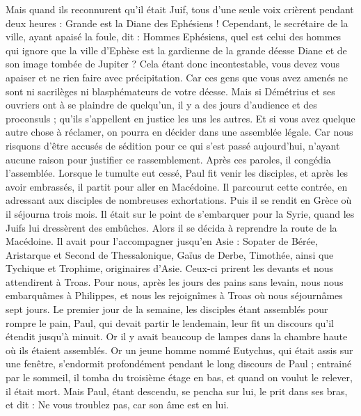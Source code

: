 \begin{multicols}{2}
Mais quand ils reconnurent qu'il était Juif, tous d’une seule voix crièrent pendant deux heures : Grande est la Diane des Ephésiens !
Cependant, le secrétaire de la ville, ayant apaisé la foule, dit : Hommes Ephésiens, quel est celui des hommes qui ignore que la ville d’Ephèse est la gardienne de la grande déesse Diane et de son image tombée de Jupiter ?
Cela étant donc incontestable, vous devez vous apaiser et ne rien faire avec précipitation.
Car ces gens que vous avez amenés ne sont ni sacrilèges ni blasphémateurs de votre déesse.
Mais si Démétrius et ses ouvriers ont à se plaindre de quelqu’un, il y a des jours d’audience et des proconsuls ; qu’ils s’appellent en justice les uns les autres.
Et si vous avez quelque autre chose à réclamer, on pourra en décider dans une assemblée légale.
Car nous risquons d’être accusés de sédition pour ce qui s'est passé aujourd'hui, n’ayant aucune raison pour justifier ce rassemblement. Après ces paroles, il congédia l’assemblée.
\VerseOne{}Lorsque le tumulte eut cessé, Paul fit venir les disciples, et après les avoir embrassés, il partit pour aller en Macédoine.
Il parcourut cette contrée, en adressant aux disciples de nombreuses exhortations.
Puis il se rendit en Grèce où il séjourna trois mois. Il était sur le point de s’embarquer pour la Syrie, quand les Juifs lui dressèrent des embûches. Alors il se décida à reprendre la route de la Macédoine.
Il avait pour l’accompagner jusqu’en Asie : Sopater de Bérée, Aristarque et Second de Thessalonique, Gaïus de Derbe, Timothée, ainsi que Tychique et Trophime, originaires d’Asie.
Ceux-ci prirent les devants et nous attendirent à Troas.
Pour nous, après les jours des pains sans levain, nous nous embarquâmes à Philippes, et nous les rejoignîmes à Troas où nous séjournâmes sept jours.
Le premier jour de la semaine, les disciples étant assemblés pour rompre le pain, Paul, qui devait partir le lendemain, leur fit un discours qu'il étendit jusqu'à minuit.
Or il y avait beaucoup de lampes dans la chambre haute où ils étaient assemblés.
Or un jeune homme nommé Eutychus, qui était assis sur une fenêtre, s’endormit profondément pendant le long discours de Paul ; entrainé par le sommeil, il tomba du troisième étage en bas, et quand on voulut le relever, il était mort.
Mais Paul, étant descendu, se pencha sur lui, le prit dans ses bras, et dit : Ne vous troublez pas, car son âme est en lui.

\end{multicols}
